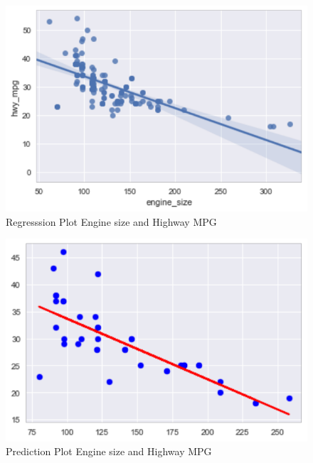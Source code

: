 \begin{figure}[htb]
  \includegraphics[scale=1.0]{images/reg_plot.pdf}
  \caption{Regresssion Plot Engine size and Highway MPG}
\label{fig:regplt}
\end{figure}

\begin{figure}[htb]
  \includegraphics[scale=1.0]{images/plot_pred_test_set.pdf}
  \caption{Prediction Plot Engine size and Highway MPG}
  \label{fig:predplt}
\end{figure}


 
